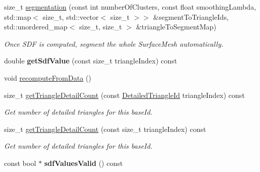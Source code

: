 \begin{DoxyCompactItemize}
\mbox{\label{classpepr3d_1_1_geometry_ab4ef6e071146e7fd4e06c26dac3ffb43}} 
size\+\_\+t \mbox{\hyperlink{classpepr3d_1_1_geometry_ab4ef6e071146e7fd4e06c26dac3ffb43}{segmentation}} (const int number\+Of\+Clusters, const float smoothing\+Lambda, std\+::map$<$ size\+\_\+t, std\+::vector$<$ size\+\_\+t $>$$>$ \&segment\+To\+Triangle\+Ids, std\+::unordered\+\_\+map$<$ size\+\_\+t, size\+\_\+t $>$ \&triangle\+To\+Segment\+Map)
\begin{DoxyCompactList}\small\item\em Once S\+DF is computed, segment the whole Surface\+Mesh automatically. \end{DoxyCompactList}\item 
\mbox{\label{classpepr3d_1_1_geometry_a5c8624f91ad0e27ab08dbab1ef7d2ada}} 
double {\bfseries get\+Sdf\+Value} (const size\+\_\+t triangle\+Index) const
\item 
void \mbox{\hyperlink{classpepr3d_1_1_geometry_a7671cab77f226a80cbea5703aba2026c}{recompute\+From\+Data}} ()
\item 
\mbox{\label{classpepr3d_1_1_geometry_aa084c208c8fcb9802d5afd68e72b527d}} 
size\+\_\+t \mbox{\hyperlink{classpepr3d_1_1_geometry_aa084c208c8fcb9802d5afd68e72b527d}{get\+Triangle\+Detail\+Count}} (const \mbox{\hyperlink{structpepr3d_1_1_detailed_triangle_id}{Detailed\+Triangle\+Id}} triangle\+Index) const
\begin{DoxyCompactList}\small\item\em Get number of detailed triangles for this base\+Id. \end{DoxyCompactList}\item 
\mbox{\label{classpepr3d_1_1_geometry_aa82245c699bf946457e251ad1176926c}} 
size\+\_\+t \mbox{\hyperlink{classpepr3d_1_1_geometry_aa82245c699bf946457e251ad1176926c}{get\+Triangle\+Detail\+Count}} (const size\+\_\+t triangle\+Index) const
\begin{DoxyCompactList}\small\item\em Get number of detailed triangles for this base\+Id. \end{DoxyCompactList}\item 
\mbox{\label{classpepr3d_1_1_geometry_af361ddfbc36e637fe8c46b7f916c07a8}} 
const bool $\ast$ {\bfseries sdf\+Values\+Valid} () const
\end{DoxyCompactItemize}
